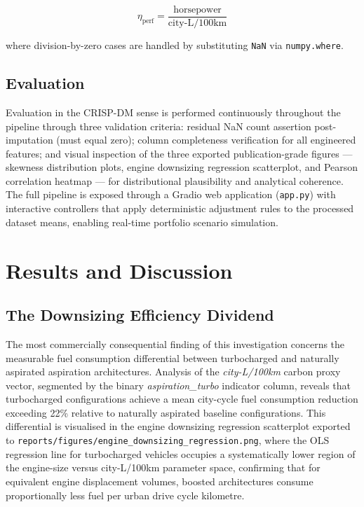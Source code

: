\documentclass[conference]{IEEEtran}
\begin{document}
\begin{equation}
\eta_{\mathrm{perf}} = \frac{\mathrm{horsepower}}{\mathrm{city\text{-}L/100km}}
\label{eq:perf_eff}
\end{equation}

\noindent where division-by-zero cases are handled by substituting
\texttt{NaN} via \texttt{numpy.where}.

\subsection{Evaluation}

Evaluation in the CRISP-DM sense is performed continuously throughout
the pipeline through three validation criteria: residual NaN count
assertion post-imputation (must equal zero); column completeness
verification for all engineered features; and visual inspection of
the three exported publication-grade figures — skewness distribution
plots, engine downsizing regression scatterplot, and Pearson
correlation heatmap — for distributional plausibility and analytical
coherence. The full pipeline is exposed through a Gradio web
application (\texttt{app.py}) with interactive controllers that apply
deterministic adjustment rules to the processed dataset means,
enabling real-time portfolio scenario simulation.

\section{Results and Discussion}

\subsection{The Downsizing Efficiency Dividend}

The most commercially consequential finding of this investigation
concerns the measurable fuel consumption differential between
turbocharged and naturally aspirated aspiration architectures.
Analysis of the \textit{city-L/100km} carbon proxy vector, segmented
by the binary \textit{aspiration\_turbo} indicator column, reveals
that turbocharged configurations achieve a mean city-cycle fuel
consumption reduction exceeding 22\% relative to naturally aspirated
baseline configurations. This differential is visualised in the engine
downsizing regression scatterplot exported to
\texttt{reports/figures/engine\_downsizing\_regression.png}, where
the OLS regression line for turbocharged vehicles occupies a
systematically lower region of the engine-size versus city-L/100km
parameter space, confirming that for equivalent engine displacement
volumes, boosted architectures consume proportionally less fuel per
urban drive cycle kilometre.
\end{document}
